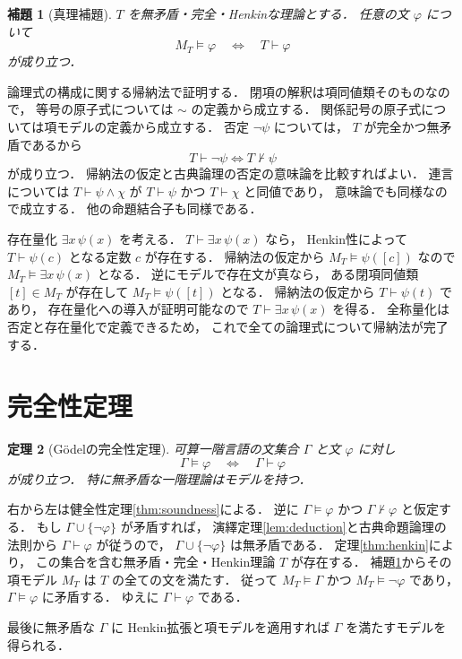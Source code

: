 \documentclass[a5paper,10pt,onecolumn]{jsarticle}
\makeatletter
\theoremstyle{mathnotetheorem}
\newtheorem{theorem}{定理}[section]
\newtheorem{lemma}[theorem]{補題}
\renewcommand{\proofname}{証明}
\renewenvironment{proof}[1][\proofname]{%
  \par\pushQED{\qed}\normalfont\topsep4\p@\@plus2\p@\relax
  \trivlist\item[\hskip\labelsep\bfseries #1]\ignorespaces
}{\popQED\endtrivlist\@endpefalse}
\makeatother
\begin{document}
\begin{lemma}[真理補題]\label{lem:truth}
$T$ を無矛盾・完全・Henkinな理論とする．
任意の文 $\varphi$ について
\[
 M_T\models\varphi
 \quad\Longleftrightarrow\quad T\vdash\varphi
\]
が成り立つ．
\end{lemma}
\begin{proof}
論理式の構成に関する帰納法で証明する．
閉項の解釈は項同値類そのものなので，
等号の原子式については $\sim$ の定義から成立する．
関係記号の原子式については項モデルの定義から成立する．
否定 $\neg\psi$ については，
$T$ が完全かつ無矛盾であるから
\[
 T\vdash\neg\psi\iff T\not\vdash\psi
\]
が成り立つ．
帰納法の仮定と古典論理の否定の意味論を比較すればよい．
連言については
$T\vdash\psi\land\chi$ が
$T\vdash\psi$ かつ $T\vdash\chi$ と同値であり，
意味論でも同様なので成立する．
他の命題結合子も同様である．

存在量化 $\exists x\,\psi(x)$ を考える．
$T\vdash\exists x\,\psi(x)$ なら，
Henkin性によって
$T\vdash\psi(c)$ となる定数 $c$ が存在する．
帰納法の仮定から
$M_T\models\psi([c])$ なので
$M_T\models\exists x\,\psi(x)$ となる．
逆にモデルで存在文が真なら，
ある閉項同値類 $[t]\in M_T$ が存在して
$M_T\models\psi([t])$ となる．
帰納法の仮定から $T\vdash\psi(t)$ であり，
存在量化への導入が証明可能なので
$T\vdash\exists x\,\psi(x)$ を得る．
全称量化は否定と存在量化で定義できるため，
これで全ての論理式について帰納法が完了する．
\end{proof}

\section{完全性定理}

\begin{theorem}[Gödelの完全性定理]\label{thm:completeness}
可算一階言語の文集合 $\Gamma$ と文 $\varphi$ に対し
\[
 \Gamma\models\varphi
 \quad\Longleftrightarrow\quad
 \Gamma\vdash\varphi
\]
が成り立つ．
特に無矛盾な一階理論はモデルを持つ．
\end{theorem}
\begin{proof}
右から左は健全性定理\ref{thm:soundness}による．
逆に $\Gamma\models\varphi$ かつ
$\Gamma\not\vdash\varphi$ と仮定する．
もし $\Gamma\cup\{\neg\varphi\}$ が矛盾すれば，
演繹定理\ref{lem:deduction}と古典命題論理の法則から
$\Gamma\vdash\varphi$ が従うので，
$\Gamma\cup\{\neg\varphi\}$ は無矛盾である．
定理\ref{thm:henkin}により，
この集合を含む無矛盾・完全・Henkin理論 $T$ が存在する．
補題\ref{lem:truth}からその項モデル $M_T$ は
$T$ の全ての文を満たす．
従って $M_T\models\Gamma$ かつ
$M_T\models\neg\varphi$ であり，
$\Gamma\models\varphi$ に矛盾する．
ゆえに $\Gamma\vdash\varphi$ である．

最後に無矛盾な $\Gamma$ に
Henkin拡張と項モデルを適用すれば
$\Gamma$ を満たすモデルを得られる．
\end{proof}
\end{document}
